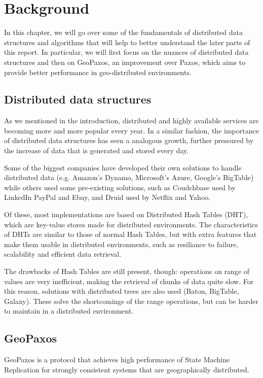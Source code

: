 \chapter{Background}\label{sec:Background}
In this chapter, we will go over some of the fundamentals of distributed data structures and algorithms that will help to better understand the later parts of this report. In particular, we will first focus on the nuances of distributed data structures and then on  GeoPaxos, an improvement over Paxos, which aims to provide better performance in geo-distributed environments.

\section{Distributed data structures}\label{sec:distributed-data-structures}
As we mentioned in the introduction, distributed and highly available services are becoming more and more popular every year. In a similar fashion, the importance of distributed data structures has seen a analogous growth, further pressured by the increase of data that is generated and stored every day. 

Some of the biggest companies have developed their own solutions to handle distributed data (e.g. Amazon's Dynamo\citep{dynamo}, Microsoft's Azure\citep{azure}, Google's BigTable\citep{bigtable}) while others used some pre-existing solutions, such as Coudchbase\citep{couchbase} used by LinkedIn PayPal and Ebay, and Druid\citep{druid} used by Netflix and Yahoo. 

Of these, most implementations are based on Distributed Hash Tables (DHT), which are key-value stores made for distributed environments.
The characteristics of DHTs are similar to those of normal Hash Tables, but with extra features that make them usable in distributed environments, such as resiliance to failure, scalability and efficient data retrieval.

The drawbacks of Hash Tables are still present, though: operations on range of values are very inefficient, making the retrieval of chunks of data quite slow. For this reason, solutions with distributed trees are also used (Baton\citep{baton}, BigTable\citep{bigtable}, Galaxy\citep{galaxy}). These solve the shortcomings of the range operations, but can be harder to maintain in a distributed environment. 

\section{GeoPaxos}\label{sec:GeoPaxos}
GeoPaxos\citep{geopaxos} is a protocol that achieves high performance of State Machine Replication for strongly consistent systems that are geographically distributed.

